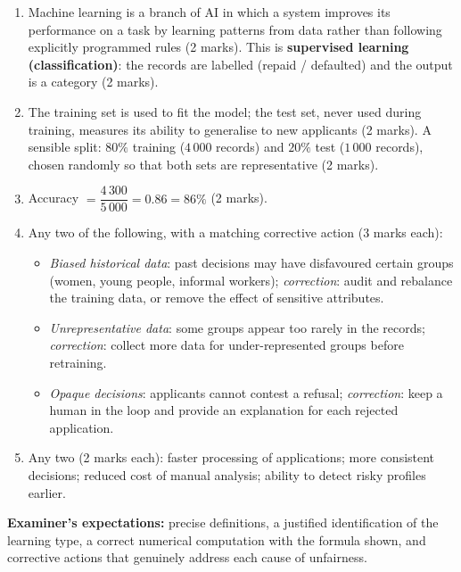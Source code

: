 \documentclass[11pt]{article}
\begin{document}
\begin{corrige}
\begin{enumerate}
\item [(a)] Machine learning is a branch of AI in which a system improves its performance on a task by learning patterns from data rather than following explicitly programmed rules (2 marks). This is \textbf{supervised learning (classification)}: the records are labelled (repaid / defaulted) and the output is a category (2 marks).
\item [(b)] The training set is used to fit the model; the test set, never used during training, measures its ability to generalise to new applicants (2 marks). A sensible split: $80\%$ training ($4\,000$ records) and $20\%$ test ($1\,000$ records), chosen randomly so that both sets are representative (2 marks).
\item [(c)] Accuracy $= \dfrac{4\,300}{5\,000} = 0.86 = 86\%$ (2 marks).
\item [(d)] Any two of the following, with a matching corrective action (3 marks each):
\begin{itemize}
\item \emph{Biased historical data}: past decisions may have disfavoured certain groups (women, young people, informal workers); \emph{correction}: audit and rebalance the training data, or remove the effect of sensitive attributes.
\item \emph{Unrepresentative data}: some groups appear too rarely in the records; \emph{correction}: collect more data for under-represented groups before retraining.
\item \emph{Opaque decisions}: applicants cannot contest a refusal; \emph{correction}: keep a human in the loop and provide an explanation for each rejected application.
\end{itemize}
\item [(e)] Any two (2 marks each): faster processing of applications; more consistent decisions; reduced cost of manual analysis; ability to detect risky profiles earlier.
\end{enumerate}
\textbf{Examiner's expectations:} precise definitions, a justified identification of the learning type, a correct numerical computation with the formula shown, and corrective actions that genuinely address each cause of unfairness.
\end{corrige}
\end{document}
